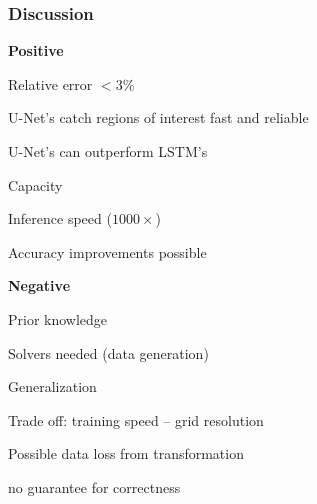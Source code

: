 \begin{frame}
    \frametitle{Discussion}
	\vspace*{0.8cm}
	
	\begin{multicols}{2}
    \textbf{Positive}

\begin{PraesentationAufzaehlung}

	\item Relative error $< 3\%$
	
	\item U-Net's catch regions of interest fast and reliable

    \item U-Net's can outperform LSTM’s
    
    \item Capacity

    \item Inference speed ($1000\times$)
    
    \item Accuracy improvements possible
\end{PraesentationAufzaehlung}

	\vfill\columnbreak
    \textbf{Negative}

\begin{PraesentationAufzaehlung}
\item Prior knowledge

\item Solvers needed (data generation)

\item Generalization 


\item Trade off: training speed -- grid resolution

\item Possible data loss from transformation

\item no guarantee for correctness

\end{PraesentationAufzaehlung}
\end{multicols}

\end{frame}
\clearpage